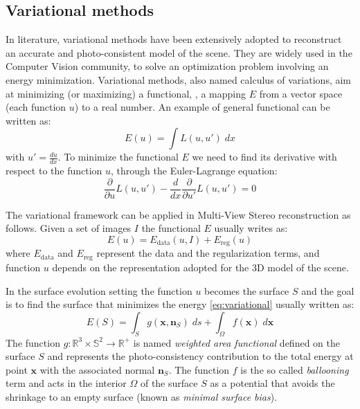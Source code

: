 \subsection{Variational methods}
\label{subsec:variational}
In literature, variational methods have been extensively adopted to reconstruct an accurate and photo-consistent model of the scene.
 They are widely used in the Computer Vision community, to solve an optimization problem involving an energy minimization.
Variational methods, also named  calculus of variations, aim at minimizing (or maximizing) a functional, \ie, a mapping $E$ from a vector space (each function $u$) to a real number. 
An example of general functional can be written as:
\begin{equation}
 E(u) = \int \mathit{L} (u, u')\;dx
\end{equation}
with $u'=\frac{du}{dx}$.
To minimize the functional $E$ we need to find its derivative with respect to the function $u$, through the Euler-Lagrange equation:
\begin{equation}
\label{eq:euler-lagrange}
 \frac{\partial}{\partial u} \mathit{L} (u, u') - \frac{d}{dx} \frac{\partial}{\partial u'}\mathit{L} (u, u') =0
\end{equation}

The variational framework can be applied in Multi-View Stereo reconstruction \cite{hermosillo2002variational} as follows.
Given a set of images $\mathit{I}$ the functional $E$ usually writes as:
\begin{equation}
\label{eq:variational}
E(\mathit{u}) = E_{\text{data}}(\mathit{u}, \mathit{I}) + E_{\text{reg}} (\mathit{u})  
\end{equation}
where $E_{\text{data}}$  and $E_{\text{reg}}$ represent the data and the regularization terms, and function $\mathit{u}$ depends on the representation adopted for the 3D model of the scene.

In the surface evolution setting the function $\mathit{u}$ becomes the surface $\mathit{S}$ and the goal is to find the surface that minimizes the energy \eqref{eq:variational} usually written as:
\begin{equation}
 E(\mathit{S}) = \int_{\mathit{S}} g(\mathbf{x}, \mathbf{n}_{\mathit{S}}) \; ds  +\int_{\mathit{\Omega}} f(\mathbf{x}) \; d\mathbf{x}
\end{equation}
The function $\mathit{g}:\mathbb{R}^3\times\mathbb{S}^2 \rightarrow \mathbb{R}^+$ is named \emph{weighted area functional}  defined on the surface $\mathit{S}$ and represents the photo-consistency contribution to the total energy at point $\mathbf{x}$ with the associated normal $\mathbf{n}_{\mathit{S}}$.
The function $\mathit{f}$ is the so called \emph{ballooning} term and acts in the interior $\mathit{\Omega}$ of the surface $\mathit{S}$ as a potential that avoids the shrinkage to an empty surface (known as \emph{minimal surface bias}).

